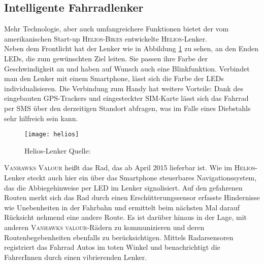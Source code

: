 \subsection{Intelligente Fahrradlenker}
Mehr Technologie, aber auch umfangreichere Funktionen bietet der vom amerikanischen Start-up \textsc{Helios-Bikes} entwickelte \textsc{Helios}-Lenker.\\ 
Neben dem Frontlicht hat der Lenker wie in Abbildung \ref{fig:helios} zu sehen, an den Enden \glspl{LED}, die zum gewünschten Ziel leiten. Sie passen ihre Farbe der Geschwindigkeit an und haben auf Wunsch auch eine Blinkfunktion. Verbindet man den Lenker mit einem \gls{Smartphone}, lässt sich die Farbe der \glspl{LED} individualisieren. Die Verbindung zum Handy hat weitere Vorteile: Dank des eingebauten \gls{GPS}-Trackers und eingesteckter SIM-Karte lässt sich das Fahrrad per SMS über den derzeitigen Standort abfragen\cite{Helios}, was im Falle eines Diebstahls sehr hilfreich sein kann.\\ 
\begin{figure}[H]
    \centering
    \texttt{[image: helios]}
    \grayRule
    \caption[Helios-Lenker]{Helios-Lenker  Quelle: \cite{Helios}}		
    \label{fig:helios}
\end{figure}
\textsc{Vanhawks Valour} heißt das Rad, das ab April 2015 lieferbar ist. Wie im \textsc{Helios}-Lenker steckt auch hier ein über das \gls{Smartphone} steuerbares Navigationssystem, das die Abbiegehinweise per \gls{LED} im Lenker signalisiert. Auf den gefahrenen Routen merkt sich das Rad durch einen Erschütterungssensor erfasste Hindernisse wie Unebenheiten in der Fahrbahn und ermittelt beim nächsten Mal darauf Rücksicht nehmend eine andere Route. Es ist darüber hinaus in der Lage, mit anderen \textsc{Vanhawks valour}-Rädern zu kommunizieren und deren Routenbegebenheiten ebenfalls zu berücksichtigen. Mittels Radarsensoren registriert das Fahrrad Autos im toten Winkel und benachrichtigt die FahrerInnen durch einen vibrierenden Lenker. \cite{vanhawks}
